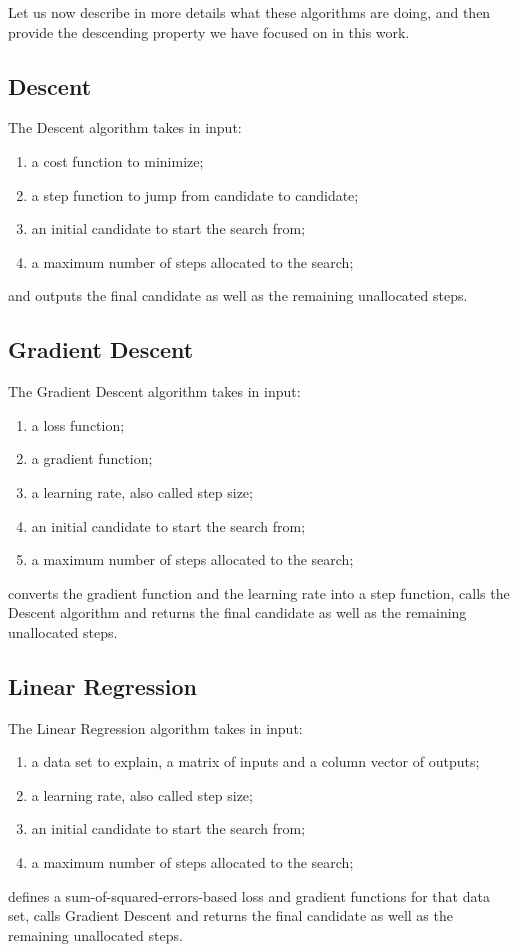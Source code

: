 \documentclass[]{report}
\begin{document}
Let us now describe in more details what these algorithms are doing,
and then provide the descending property we have focused on in this
work.

\subsection{Descent}
The Descent algorithm takes in input:
\begin{enumerate}
\item a cost function to minimize;
\item a step function to jump from candidate to candidate;
\item an initial candidate to start the search from;
\item a maximum number of steps allocated to the search;
\end{enumerate}
and outputs the final candidate as well as the remaining unallocated
steps.

\subsection{Gradient Descent}
The Gradient Descent algorithm takes in input:
\begin{enumerate}
\item a loss function;
\item a gradient function;
\item a learning rate, also called step size;
\item an initial candidate to start the search from;
\item a maximum number of steps allocated to the search;
\end{enumerate}
converts the gradient function and the learning rate into a step
function, calls the Descent algorithm and returns the final candidate
as well as the remaining unallocated steps.

\subsection{Linear Regression}
The Linear Regression algorithm takes in input:
\begin{enumerate}
\item a data set to explain, a matrix of inputs and a column vector
  of outputs;
\item a learning rate, also called step size;
\item an initial candidate to start the search from;
\item a maximum number of steps allocated to the search;
\end{enumerate}
defines a sum-of-squared-errors-based loss and gradient functions for
that data set, calls Gradient Descent and returns the final candidate
as well as the remaining unallocated steps.
\end{document}
